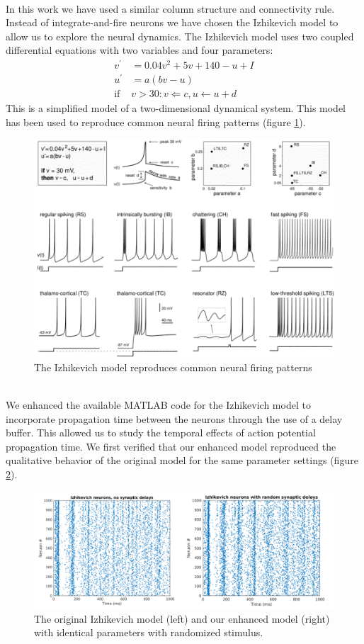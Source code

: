 \documentclass[a4paper,11pt]{article}
\begin{document}
\\
In this work we have used a similar column structure and connectivity rule. 
Instead of integrate-and-fire neurons we have chosen the Izhikevich model \cite{izhikevich2003} to allow us to explore the neural dynamics.
The Izhikevich model uses two coupled differential equations with two variables and four parameters:
\begin{align}
 v^\prime &= 0.04v^2+5v+140-u+I\\
 u^\prime &= a(bv-u)\\
 \text{if } &v>30: v\Leftarrow c, u\leftarrow u+d
\end{align}
This is a simplified model of a two-dimensional dynamical system.
This model has been used to reproduce common neural firing patterns (figure \ref{fig:izzy_model}).
\begin{figure}
 \caption{The Izhikevich model reproduces common neural firing patterns \cite{izhikevich2003}}
 \label{fig:izzy_model}
 \centering
   \includegraphics[width=\textwidth]{fig/izzy_model}
\end{figure}
\\ 
We enhanced the available MATLAB code for the Izhikevich model to incorporate propagation time between the neurons through the use of a delay buffer.
This allowed us to study the temporal effects of action potential propagation time.
We first verified that our enhanced model reproduced the qualitative behavior of the original model for the same parameter settings (figure \ref{fig:izzy_enhanced}).
\begin{figure}
 \caption{The original Izhikevich model (left) and our enhanced model (right) with identical parameters with randomized stimulus.}
 \label{fig:izzy_enhanced}
 \centering
   \includegraphics[width=\textwidth]{fig/izzy_enhanced}
\end{figure}
\end{document}
